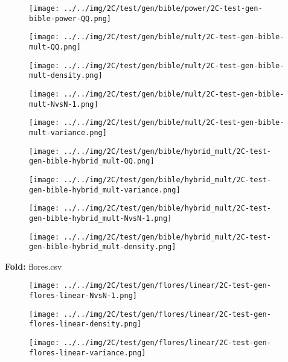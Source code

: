 \begin{figure}[H]
\centering	\texttt{[image: ../../img/2C/test/gen/bible/power/2C-test-gen-bible-power-QQ.png]}
\end{figure}
\begin{figure}[H]
\centering	\texttt{[image: ../../img/2C/test/gen/bible/mult/2C-test-gen-bible-mult-QQ.png]}
\end{figure}
\begin{figure}[H]
\centering	\texttt{[image: ../../img/2C/test/gen/bible/mult/2C-test-gen-bible-mult-density.png]}
\end{figure}
\begin{figure}[H]
\centering	\texttt{[image: ../../img/2C/test/gen/bible/mult/2C-test-gen-bible-mult-NvsN-1.png]}
\end{figure}
\begin{figure}[H]
\centering	\texttt{[image: ../../img/2C/test/gen/bible/mult/2C-test-gen-bible-mult-variance.png]}
\end{figure}
\begin{figure}[H]
\centering	\texttt{[image: ../../img/2C/test/gen/bible/hybrid\_mult/2C-test-gen-bible-hybrid\_mult-QQ.png]}
\end{figure}
\begin{figure}[H]
\centering	\texttt{[image: ../../img/2C/test/gen/bible/hybrid\_mult/2C-test-gen-bible-hybrid\_mult-variance.png]}
\end{figure}
\begin{figure}[H]
\centering	\texttt{[image: ../../img/2C/test/gen/bible/hybrid\_mult/2C-test-gen-bible-hybrid\_mult-NvsN-1.png]}
\end{figure}
\begin{figure}[H]
\centering	\texttt{[image: ../../img/2C/test/gen/bible/hybrid\_mult/2C-test-gen-bible-hybrid\_mult-density.png]}
\end{figure}
\textbf{Fold:} flores.csv
\begin{figure}[H]
\centering	\texttt{[image: ../../img/2C/test/gen/flores/linear/2C-test-gen-flores-linear-NvsN-1.png]}
\end{figure}
\begin{figure}[H]
\centering	\texttt{[image: ../../img/2C/test/gen/flores/linear/2C-test-gen-flores-linear-density.png]}
\end{figure}
\begin{figure}[H]
\centering	\texttt{[image: ../../img/2C/test/gen/flores/linear/2C-test-gen-flores-linear-variance.png]}
\end{figure}

